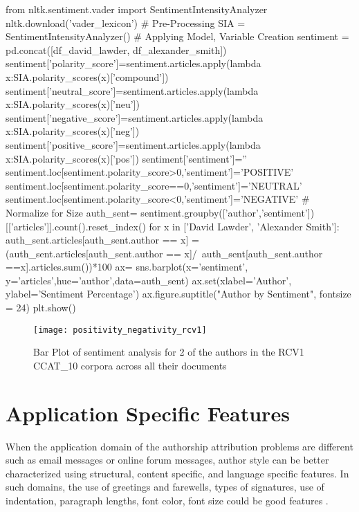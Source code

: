 \begin{lstlisting}[frame=none,caption={Compute sentence Positivity and Negativity scores},captionpos=b,label=lst:posnegRCV1CCAT10]
\end{lstlisting}
\begin{python}	
	from nltk.sentiment.vader import SentimentIntensityAnalyzer
	nltk.download('vader_lexicon')
	# Pre-Processing
	SIA = SentimentIntensityAnalyzer()
	# Applying Model, Variable Creation
	sentiment = pd.concat([df_david_lawder, df_alexander_smith])
	sentiment['polarity_score']=sentiment.articles.apply(lambda x:SIA.polarity_scores(x)['compound'])
	sentiment['neutral_score']=sentiment.articles.apply(lambda x:SIA.polarity_scores(x)['neu'])
	sentiment['negative_score']=sentiment.articles.apply(lambda x:SIA.polarity_scores(x)['neg'])
	sentiment['positive_score']=sentiment.articles.apply(lambda x:SIA.polarity_scores(x)['pos'])
	sentiment['sentiment']=''
	sentiment.loc[sentiment.polarity_score>0,'sentiment']='POSITIVE'
	sentiment.loc[sentiment.polarity_score==0,'sentiment']='NEUTRAL'
	sentiment.loc[sentiment.polarity_score<0,'sentiment']='NEGATIVE'
	# Normalize for Size
	auth_sent= sentiment.groupby(['author','sentiment'])[['articles']].count().reset_index()
	for x in ['David Lawder', 'Alexander Smith']:
	auth_sent.articles[auth_sent.author == x] = (auth_sent.articles[auth_sent.author == x]/\
	auth_sent[auth_sent.author ==x].articles.sum())*100
	ax= sns.barplot(x='sentiment', y='articles',hue='author',data=auth_sent)
	ax.set(xlabel='Author', ylabel='Sentiment Percentage')
	ax.figure.suptitle("Author by Sentiment", fontsize = 24)
	plt.show()
\end{python}

\begin{figure}[ht]
	\centering
	\texttt{[image: positivity\_negativity\_rcv1]}
	\caption[Positivity and Negativity scores for RCV1 authors]{Bar Plot of sentiment analysis for 2 of the authors in the RCV1 CCAT\_10 corpora across all their documents}
	\label{fig:rcv1_ccat10_sentiment_analysis}
\end{figure}

\section{Application Specific Features}

When the application domain of the authorship attribution problems are different
such as email messages or online forum messages, author style can be better characterized using structural, content specific, and language specific features. In such
domains, the use of greetings and farewells, types of signatures, use of indentation,
paragraph lengths, font color, font size could be good features \cite{stamatatos2009survey}.

